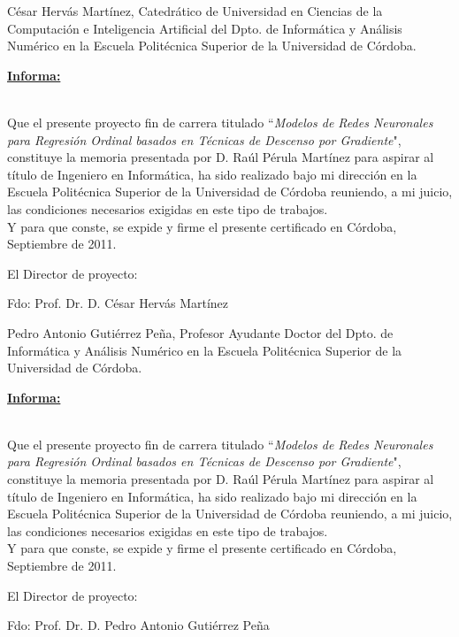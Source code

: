 \pagestyle{empty}
\topmargin=0cm

César Hervás Martínez, Catedrático de Universidad en Ciencias de la Computación e Inteligencia Artificial del Dpto. de Informática y Análisis Numérico en la Escuela Politécnica Superior de la Universidad de Córdoba.

\vspace{2cm}


\begin{LARGE}
\underline{\textbf{Informa:}}
\end{LARGE}
\\

Que el presente proyecto fin de carrera titulado ``\textit{Modelos de Redes Neuronales para Regresión Ordinal basados en Técnicas de Descenso por Gradiente}", constituye la memoria presentada por D. Raúl Pérula Martínez para aspirar al título de Ingeniero en Informática, ha sido realizado bajo mi dirección en la Escuela Politécnica Superior de la Universidad de Córdoba reuniendo, a mi juicio, las condiciones necesarios exigidas en este tipo de trabajos.\\

Y para que conste, se expide y firme el presente certificado en Córdoba, Septiembre de 2011.

\vspace{2cm}

El Director de proyecto:

\vspace{3.5cm}

Fdo: Prof. Dr. D. César Hervás Martínez


\newpage{\pagestyle{empty}\cleardoublepage}

Pedro Antonio Gutiérrez Peña, Profesor Ayudante Doctor del Dpto. de Informática y Análisis Numérico en la Escuela Politécnica Superior de la Universidad de Córdoba.

\vspace{2cm}


\begin{LARGE}
\underline{\textbf{Informa:}}
\end{LARGE}
\\

Que el presente proyecto fin de carrera titulado ``\textit{Modelos de Redes Neuronales para Regresión Ordinal basados en Técnicas de Descenso por Gradiente}", constituye la memoria presentada por D. Raúl Pérula Martínez para aspirar al título de Ingeniero en Informática, ha sido realizado bajo mi dirección en la Escuela Politécnica Superior de la Universidad de Córdoba reuniendo, a mi juicio, las condiciones necesarios exigidas en este tipo de trabajos.\\

Y para que conste, se expide y firme el presente certificado en Córdoba, Septiembre de 2011.

\vspace{2cm}

El Director de proyecto:

\vspace{3.5cm}

Fdo: Prof. Dr. D. Pedro Antonio Gutiérrez Peña
